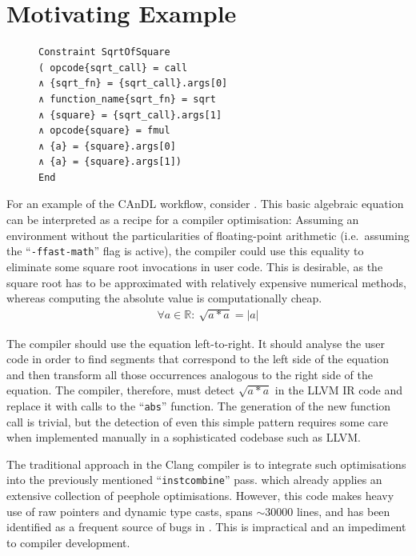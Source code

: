 \section{Motivating Example}

\begin{figure}[b]
\centering
\begin{minipage}[t]{0.68\textwidth}
\begin{lstlisting}[language=CAnDL,label={fig:candlspec},caption=
   {The left side of \Cref{fig:root} as specified in CAnDL}]
Constraint SqrtOfSquare
( opcode{sqrt_call} = call
∧ {sqrt_fn} = {sqrt_call}.args[0]
∧ function_name{sqrt_fn} = sqrt
∧ {square} = {sqrt_call}.args[1]
∧ opcode{square} = fmul
∧ {a} = {square}.args[0]
∧ {a} = {square}.args[1])
End
\end{lstlisting}
\end{minipage}
\end{figure}

    For an example of the CAnDL workflow, consider .
    This basic algebraic equation can be interpreted as a recipe for a compiler
    optimisation:
    Assuming an environment without the particularities of floating-point
    arithmetic (i.e.\ assuming the ``{\tt-ffast-math}'' flag is active), the
    compiler could use this equality to eliminate some square root invocations
    in user code.
    This is desirable, as the square root has to be approximated with relatively
    expensive numerical methods, whereas computing the absolute value is
    computationally cheap.
    \begin{align}
    \label{fig:root}
    \forall a\in \mathbb{R}\colon\ \sqrt{a*a}=|a|
    \end{align}

    The compiler should use the equation left-to-right.
    It should analyse the user code in order to find segments that correspond to
    the left side of the equation and then transform all those occurrences
    analogous to the right side of the equation.
    The compiler, therefore, must detect $\sqrt{a*a}$ in the LLVM IR code and
    replace it with calls to the ``{\tt abs}'' function.
    The generation of the new function call is trivial, but the detection of
    even this simple pattern requires some care when implemented manually in
    a sophisticated codebase such as LLVM.

    The traditional approach in the Clang compiler is to integrate such
    optimisations into the previously mentioned ``{\tt instcombine}'' pass.
    which already applies an extensive collection of peephole optimisations.
    However, this code makes heavy use of raw pointers and dynamic type casts,
    spans ${\sim}30000$ lines, and has been identified as a frequent source of
    bugs in
    \citet{Menendez:2017:ADP:3062341.3062372,Yang:2011:FUB:1993316.1993532}.
    This is impractical and an impediment to compiler development.

